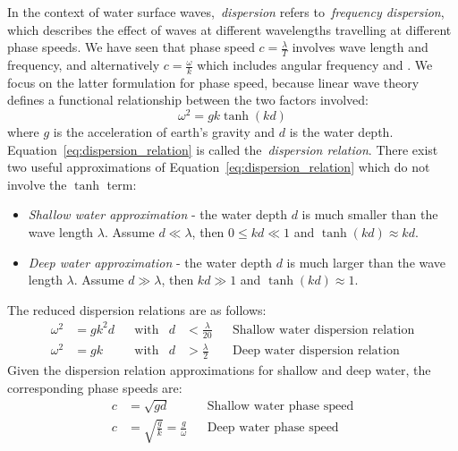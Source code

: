 In the context of water surface waves,~\emph{dispersion} refers to~\emph{frequency dispersion}, which describes
the effect of waves at different wavelengths travelling at different phase speeds. We have seen that
phase speed $c = \frac{\lambda}{T}$ involves wave length and frequency, and alternatively $c = \frac{\omega}{k}$
which includes angular frequency and \wavenumber. We focus on the latter formulation for phase speed, because
linear wave theory defines a functional relationship between the two factors involved:
\begin{equation}
\label{eq:dispersion_relation}
 \omega^2 = gk\tanh(kd)
\end{equation}
%
where $g$ is the acceleration of earth's gravity and $d$ is the water depth. Equation~\ref{eq:dispersion_relation}
is called the~\emph{dispersion relation}.
There exist two useful approximations of Equation~\ref{eq:dispersion_relation} which do not involve the $\tanh$ term:
\begin{itemize}
 \item \emph{Shallow water approximation} - the water depth $d$ is much smaller than the wave length $\lambda$.
 Assume $d \ll \lambda$, then $0 \leq kd \ll 1$ and $\tanh(kd) \approx kd$.
 \item \emph{Deep water approximation} - the water depth $d$ is much larger than the wave length $\lambda$.
 Assume $d \gg \lambda$, then $kd \gg 1$ and $\tanh(kd) \approx 1$.
\end{itemize}
%
The reduced dispersion relations are as follows:
\begin{align*}
\omega^2 & = gk^2d && \text{with} & d &< \frac{\lambda}{20}  && \text{Shallow 
water dispersion relation}\\
\omega^2 & = gk    && \text{with} & d &> \frac{\lambda}{2} && \text{Deep water 
dispersion relation}
\end{align*}
%
Given the dispersion relation approximations for shallow and deep water, the corresponding
phase speeds are:
\begin{align}
 \label{eq:phase_speed_shallow_water} c &= \sqrt{gd} && \text{Shallow water phase speed}\\
  \label{eq:phase_speed_deep_water}   c &= \sqrt{\frac{g}{k}} = \frac{g}{\omega} && \text{Deep water phase speed}
\end{align}
